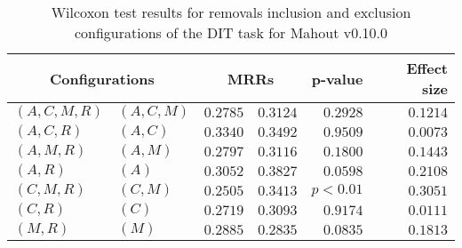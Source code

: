
\begin{table}
\begin{spacing}{1.2}
\centering
\caption{Wilcoxon test results for removals inclusion and exclusion configurations of the DIT task for Mahout v0.10.0}
\label{table:versus-wilcox-mahout-dit-removals}
\begin{tabular}{ll|rr|rr}
\toprule
      \multicolumn{2}{c|}{Configurations} &          \multicolumn{2}{c|}{MRRs} &       p-value & Effect size \\
\midrule
 $(A,C,M,R)$ &  $(A,C,M)$ & $0.2785$ & $0.3124$ & $0.2928$ &    $0.1214$ \\
   $(A,C,R)$ &    $(A,C)$ & $0.3340$ & $0.3492$ & $0.9509$ &    $0.0073$ \\
   $(A,M,R)$ &    $(A,M)$ & $0.2797$ & $0.3116$ & $0.1800$ &    $0.1443$ \\
     $(A,R)$ &      $(A)$ & $0.3052$ & $0.3827$ & $0.0598$ &    $0.2108$ \\
   $(C,M,R)$ &    $(C,M)$ & $0.2505$ & $0.3413$ & $p<0.01$ &    $0.3051$ \\
     $(C,R)$ &      $(C)$ & $0.2719$ & $0.3093$ & $0.9174$ &    $0.0111$ \\
     $(M,R)$ &      $(M)$ & $0.2885$ & $0.2835$ & $0.0835$ &    $0.1813$ \\
\bottomrule
\end{tabular}

\end{spacing}
\end{table}

